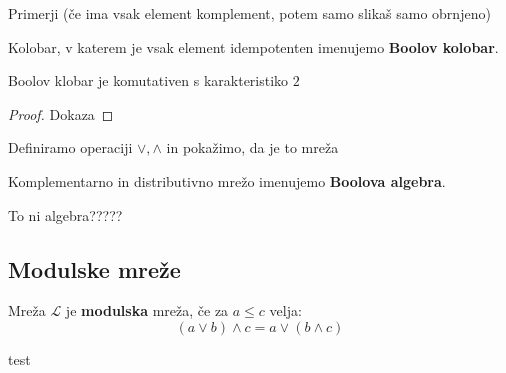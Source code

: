 \documentclass{beamer}
\begin{document}
\begin{frame}
Primerji (če ima vsak element komplement, potem samo slikaš samo obrnjeno)
\end{frame}

\begin{frame}%
\begin{definition}
Kolobar, v katerem je vsak element idempotenten imenujemo \textbf{Boolov kolobar}.
\end{definition}
\end{frame}


\begin{frame}
\begin{theorem}
Boolov klobar je komutativen s karakteristiko $2$
\end{theorem}

\begin{proof}
Dokaza
\end{proof}
\end{frame}

\begin{frame}
\begin{block}{}
Definiramo operaciji $\lor, \land$ in pokažimo, da je to mreža
\end{block}
\end{frame}


\begin{frame}
\begin{definition}
Komplementarno in distributivno mrežo imenujemo \textbf{Boolova algebra}.
\end{definition}

\begin{block}{}
To ni algebra?????
\end{block}
\end{frame}

\begin{frame}
\section{Modulske mreže}
\begin{definition}
Mreža $\mathcal{L}$ je \textbf{modulska} mreža, če za $a \leq c$ velja:
$$(a \lor b) \land c = a \lor (b \land c)$$
\end{definition}
\end{frame}


\begin{frame}
test
\end{frame}
\end{document}
